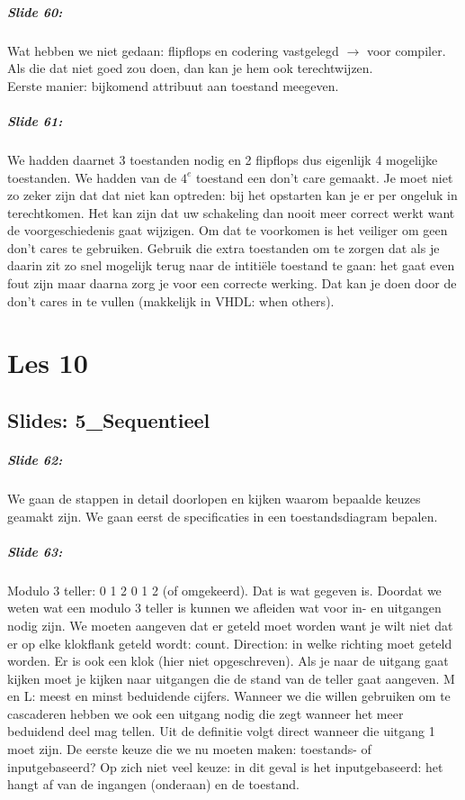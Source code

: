 \documentclass[10pt,a4paper]{book}
\begin{document}
\paragraph{Slide 60:} Wat hebben we niet gedaan: flipflops en codering vastgelegd $\rightarrow$ voor compiler. Als die dat niet goed zou doen, dan kan je hem ook terechtwijzen.\\
Eerste manier: bijkomend attribuut aan toestand meegeven. 

\paragraph{Slide 61:} We hadden daarnet 3 toestanden nodig en 2 flipflops dus eigenlijk 4 mogelijke toestanden. We hadden van de $4^e$ toestand een don't care gemaakt. Je moet niet zo zeker zijn dat dat niet kan optreden: bij het opstarten kan je er per ongeluk in terechtkomen. Het kan zijn dat uw schakeling dan nooit meer correct werkt want de voorgeschiedenis gaat wijzigen. Om dat te voorkomen is het veiliger om geen don't cares te gebruiken. Gebruik die extra toestanden om te zorgen dat als je daarin zit zo snel mogelijk terug naar de intiti\"ele toestand te gaan: het gaat even fout zijn maar daarna zorg je voor een correcte werking.
Dat kan je doen door de don't cares in te vullen (makkelijk in VHDL: when others).

\chapter{Les 10}

\section{Slides: 5\_Sequentieel}

\paragraph{Slide 62:} We gaan de stappen in detail doorlopen en kijken waarom bepaalde keuzes geamakt zijn. We gaan eerst de specificaties in een toestandsdiagram bepalen.

\paragraph{Slide 63:} Modulo 3 teller: 0 1 2 0 1 2 (of omgekeerd). Dat is wat gegeven is. Doordat we weten wat een modulo 3 teller is kunnen we afleiden wat voor in- en uitgangen nodig zijn. We moeten aangeven dat er geteld moet worden want je wilt niet dat er op elke klokflank geteld wordt: count. Direction: in welke richting moet geteld worden. Er is ook een klok (hier niet opgeschreven). Als je naar de uitgang gaat kijken moet je kijken naar uitgangen die de stand van de teller gaat aangeven. M en L: meest en minst beduidende cijfers. Wanneer we die willen gebruiken om te cascaderen hebben we ook een uitgang nodig die zegt wanneer het meer beduidend deel mag tellen. Uit de definitie volgt direct wanneer die uitgang 1 moet zijn. De eerste keuze die we nu moeten maken: toestands- of inputgebaseerd? Op zich niet veel keuze: in dit geval is het inputgebaseerd: het hangt af van de ingangen (onderaan) en de toestand.
\end{document}
